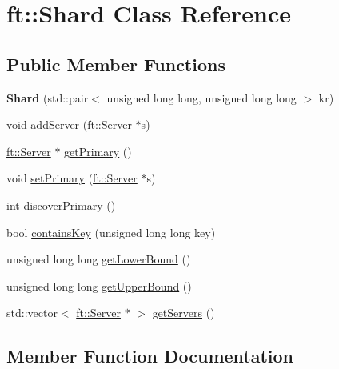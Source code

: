 \hypertarget{classft_1_1Shard}{}\section{ft\+:\+:Shard Class Reference}
\label{classft_1_1Shard}
\subsection*{Public Member Functions}
\begin{DoxyCompactItemize}
\item 
\mbox{\label{classft_1_1Shard_a12f4f5734184d8c7382cbbe66d1d26ed}} 
{\bfseries Shard} (std\+::pair$<$ unsigned long long, unsigned long long $>$ kr)
\item 
void \mbox{\hyperlink{classft_1_1Shard_a2d393309209fc78d93ccf0bb3426c431}{add\+Server}} (\mbox{\hyperlink{classft_1_1Server}{ft\+::\+Server}} $\ast$s)
\item 
\mbox{\hyperlink{classft_1_1Server}{ft\+::\+Server}} $\ast$ \mbox{\hyperlink{classft_1_1Shard_a76b726de0fb962f51f453c68ebe751e3}{get\+Primary}} ()
\item 
void \mbox{\hyperlink{classft_1_1Shard_a9a850b8347f8be6b939f00ee91463da7}{set\+Primary}} (\mbox{\hyperlink{classft_1_1Server}{ft\+::\+Server}} $\ast$s)
\item 
int \mbox{\hyperlink{classft_1_1Shard_accde84c93a127987f75dccc9c57275b5}{discover\+Primary}} ()
\item 
bool \mbox{\hyperlink{classft_1_1Shard_a42e25665d6fc9d6075d0477e3470c293}{contains\+Key}} (unsigned long long key)
\item 
unsigned long long \mbox{\hyperlink{classft_1_1Shard_a5c75dfb7d06ed5ff8a1ceeca7b199576}{get\+Lower\+Bound}} ()
\item 
unsigned long long \mbox{\hyperlink{classft_1_1Shard_adf483639946d24a658d2e07a498e08b2}{get\+Upper\+Bound}} ()
\item 
std\+::vector$<$ \mbox{\hyperlink{classft_1_1Server}{ft\+::\+Server}} $\ast$ $>$ \mbox{\hyperlink{classft_1_1Shard_ac06fd0bca4f4254d114401ecb58d744f}{get\+Servers}} ()
\end{DoxyCompactItemize}


\subsection{Member Function Documentation}
\mbox{\label{classft_1_1Shard_a2d393309209fc78d93ccf0bb3426c431}} 
